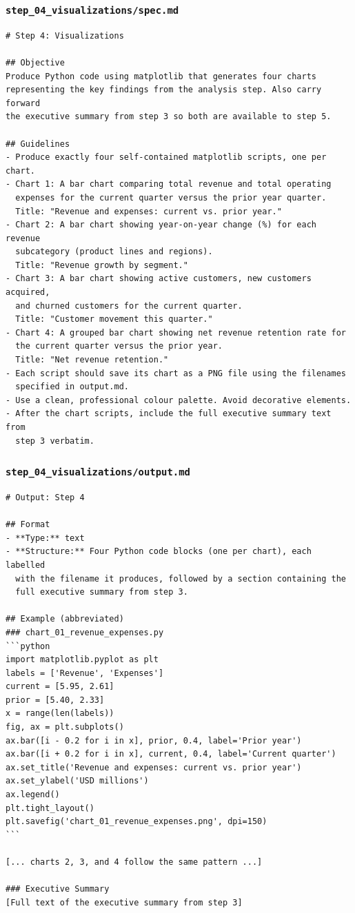 \documentclass[12pt, a4paper]{article}
\begin{document}
\subsubsection{\texttt{step\_04\_visualizations/spec.md}}

\begin{lstlisting}[language={}]
# Step 4: Visualizations

## Objective
Produce Python code using matplotlib that generates four charts
representing the key findings from the analysis step. Also carry forward
the executive summary from step 3 so both are available to step 5.

## Guidelines
- Produce exactly four self-contained matplotlib scripts, one per chart.
- Chart 1: A bar chart comparing total revenue and total operating
  expenses for the current quarter versus the prior year quarter.
  Title: "Revenue and expenses: current vs. prior year."
- Chart 2: A bar chart showing year-on-year change (%) for each revenue
  subcategory (product lines and regions).
  Title: "Revenue growth by segment."
- Chart 3: A bar chart showing active customers, new customers acquired,
  and churned customers for the current quarter.
  Title: "Customer movement this quarter."
- Chart 4: A grouped bar chart showing net revenue retention rate for
  the current quarter versus the prior year.
  Title: "Net revenue retention."
- Each script should save its chart as a PNG file using the filenames
  specified in output.md.
- Use a clean, professional colour palette. Avoid decorative elements.
- After the chart scripts, include the full executive summary text from
  step 3 verbatim.
\end{lstlisting}

\subsubsection{\texttt{step\_04\_visualizations/output.md}}

\begin{lstlisting}[language={}]
# Output: Step 4

## Format
- **Type:** text
- **Structure:** Four Python code blocks (one per chart), each labelled
  with the filename it produces, followed by a section containing the
  full executive summary from step 3.

## Example (abbreviated)
### chart_01_revenue_expenses.py
```python
import matplotlib.pyplot as plt
labels = ['Revenue', 'Expenses']
current = [5.95, 2.61]
prior = [5.40, 2.33]
x = range(len(labels))
fig, ax = plt.subplots()
ax.bar([i - 0.2 for i in x], prior, 0.4, label='Prior year')
ax.bar([i + 0.2 for i in x], current, 0.4, label='Current quarter')
ax.set_title('Revenue and expenses: current vs. prior year')
ax.set_ylabel('USD millions')
ax.legend()
plt.tight_layout()
plt.savefig('chart_01_revenue_expenses.png', dpi=150)
```

[... charts 2, 3, and 4 follow the same pattern ...]

### Executive Summary
[Full text of the executive summary from step 3]
\end{lstlisting}
\end{document}
